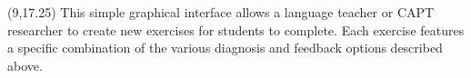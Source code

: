 \documentclass[a0,portrait]{a0poster}
\def\bannercolor{BannerSixColor}
\newcommand{\headingcolor}{\color{BannerSixColor}}
\newcommand{\titlecolor}{\color{TitleColor}}
\newcommand{\banner}{\LARGE \tikz{\path[draw=\bannercolor,fill=\bannercolor] (0,0) rectangle (\linewidth,2.25em);}}
\def\Highlight#1{{\sffamily \headingcolor #1}}
\let\Textsize\Large
\def\LHead#1{\noindent{\sffamily \LARGE \headingcolor #1}\smallskip}
\begin{document}
 \begin{textblock}{2.35}(9,17.25)
   \Textsize
  This simple graphical interface allows a language teacher or CAPT researcher to create new exercises for students to complete. Each exercise features a specific combination of the various diagnosis and feedback options described above. %
  
  
 
 
% 

%  
  
\end{textblock}


% 
\end{document}

